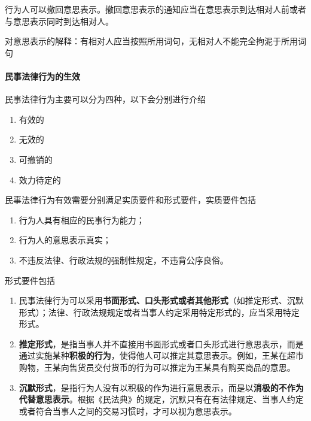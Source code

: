 \documentclass[UTF8,12pt]{ctexart}
\numberwithin{equation}{section} %
\numberwithin{figure}{section}
\numberwithin{table}{section}
\begin{document}
	行为人可以撤回意思表示。撤回意思表示的通知应当在意思表示到达相对人前或者与意思表示同时到达相对人。
	
	对意思表示的解释：有相对人应当按照所用词句，无相对人不能完全拘泥于所用词句
	
	\paragraph{民事法律行为的生效}
	民事法律行为主要可以分为四种，以下会分别进行介绍
	\begin{enumerate}
		\item 有效的
		
		\item 无效的
		
		\item 可撤销的
		
		\item 效力待定的
	\end{enumerate}
	
	民事法律行为有效需要分别满足实质要件和形式要件，实质要件包括
	\begin{enumerate}
		\item 行为人具有相应的民事行为能力；
		
		\item 行为人的意思表示真实；
		
		\item 不违反法律、行政法规的强制性规定，不违背公序良俗。
	\end{enumerate}
	
	形式要件包括
	\begin{enumerate}
		\item 民事法律行为可以采用\textbf{书面形式、口头形式或者其他形式}（如推定形式、沉默形式）；法律、行政法规规定或者当事人约定采用特定形式的，应当采用特定形式。
		
		\item \textbf{推定形式}，是指当事人并不直接用书面形式或者口头形式进行意思表示，而是通过实施某种\textbf{积极的行为}，使得他人可以推定其意思表示。例如，王某在超市购物，王某向售货员交付货币的行为可以推定为王某具有购买商品的意思。
		
		\item \textbf{沉默形式}，是指行为人没有以积极的作为进行意思表示，而是以\textbf{消极的不作为代替意思表示}。根据《民法典》的规定，沉默只有在有法律规定、当事人约定或者符合当事人之间的交易习惯时，才可以视为意思表示。
	\end{enumerate}
	
\end{document}
